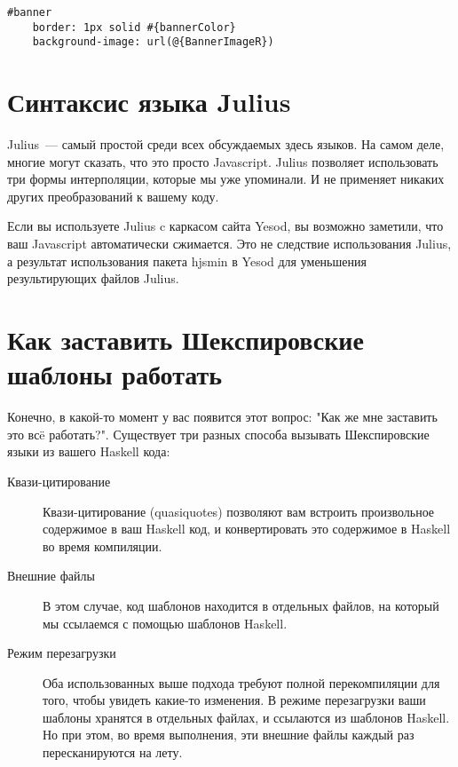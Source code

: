 \begin{lstlisting}
#banner
    border: 1px solid #{bannerColor}
    background-image: url(@{BannerImageR})
\end{lstlisting}

\section{Синтаксис языка Julius}

Julius~--- самый простой среди всех обсуждаемых здесь языков. На самом деле,
многие могут сказать, что это просто Javascript. Julius позволяет использовать
три формы интерполяции, которые мы уже упоминали.  И не применяет никаких
других преобразований к вашему коду.

\begin{remark}
    Если вы используете Julius c каркасом сайта Yesod, вы возможно заметили,
    что ваш Javascript автоматически сжимается. Это не следствие использования
    Julius, а результат использования пакета hjsmin в Yesod для уменьшения
    результирующих файлов Julius.
\end{remark}

\section{Как заставить Шекспировские шаблоны работать}

Конечно, в какой-то момент у вас появится этот вопрос: "Как же мне заставить
это всë работать?". Существует три разных способа вызывать Шекспировские языки
из вашего Haskell кода:

\begin{description}
    \item[Квази-цитирование] \hfill
    Квази-цитирование (quasiquotes) позволяют вам встроить произвольное
    содержимое в ваш Haskell код, и конвертировать это содержимое в Haskell во
    время компиляции.

    \item[Внешние файлы] \hfill
    В этом случае, код шаблонов находится в отдельных файлов, на который мы
    ссылаемся с помощью шаблонов Haskell.

    \item[Режим перезагрузки] \hfill
    Оба использованных выше подхода требуют полной перекомпиляции для того,
    чтобы увидеть какие-то изменения. В режиме перезагрузки ваши шаблоны
    хранятся в отдельных файлах, и ссылаются из шаблонов Haskell. Но при этом,
    во время выполнения, эти внешние файлы каждый раз пересканируются на лету.
\end{description}

